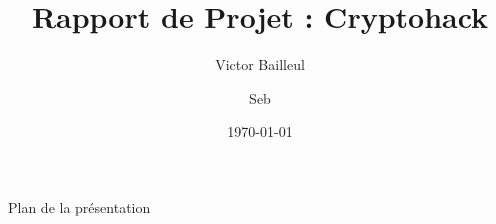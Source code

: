 \documentclass{beamer}
\title{Rapport de Projet : Cryptohack}
\author{Victor Bailleul \and Seb}
\institute{Université Fictive de LaTeX} %
\date{\today}
\begin{document}
    \begin{frame}
        \begin{figure}
        \end{figure}
        \titlepage
    \end{frame}

    \begin{frame}{Plan de la présentation}
        \tableofcontents
    \end{frame}

    
    
    
    
\end{document}
